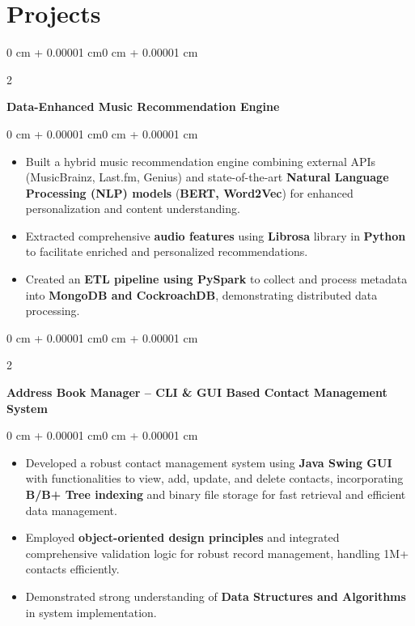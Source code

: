 \documentclass[10pt, letterpaper]{article}
\newenvironment{highlights}{
\begin{itemize}[topsep=0.10 cm,parsep=0.10 cm,partopsep=0pt,itemsep=0pt,leftmargin=0 cm + 10pt]
}{
\end{itemize}
}
\newenvironment{onecolentry}{
\begin{adjustwidth}{0 cm + 0.00001 cm}{0 cm + 0.00001 cm}
}{
\end{adjustwidth}
}
\newenvironment{twocolentry}[2][]{
\onecolentry
\def\secondColumn{#2}
\setcolumnwidth{\fill, 4.5 cm}
\begin{paracol}{2}
}{
\switchcolumn \raggedleft \secondColumn
\end{paracol}
\endonecolentry
}
\begin{document}
\section{Projects}
\begin{twocolentry}{}
\textbf{Data-Enhanced Music Recommendation Engine}
\end{twocolentry}
\begin{onecolentry}
\begin{highlights}
\item Built a hybrid music recommendation engine combining external APIs (MusicBrainz, Last.fm, Genius) and state-of-the-art \textbf{Natural Language Processing (NLP) models} (\textbf{BERT, Word2Vec}) for enhanced personalization and content understanding.
\item Extracted comprehensive \textbf{audio features} using \textbf{Librosa} library in \textbf{Python} to facilitate enriched and personalized recommendations.
\item Created an \textbf{ETL pipeline using PySpark} to collect and process metadata into \textbf{MongoDB and CockroachDB}, demonstrating distributed data processing.
\end{highlights}
\end{onecolentry}
\vspace{0.1 cm}
\begin{twocolentry}{}
\textbf{Address Book Manager – CLI \& GUI Based Contact Management System}
\end{twocolentry}
\begin{onecolentry}
\begin{highlights}
\item Developed a robust contact management system using \textbf{Java Swing GUI} with functionalities to view, add, update, and delete contacts, incorporating \textbf{B/B+ Tree indexing} and binary file storage for fast retrieval and efficient data management.
\item Employed \textbf{object-oriented design principles} and integrated comprehensive validation logic for robust record management, handling 1M+ contacts efficiently.
\item Demonstrated strong understanding of \textbf{Data Structures and Algorithms} in system implementation.
\end{highlights}
\end{onecolentry}
\end{document}
